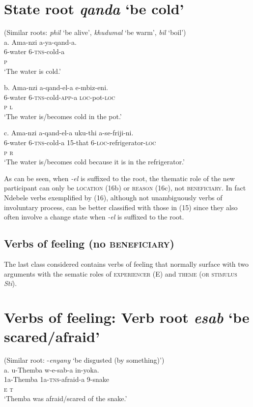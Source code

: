 \documentclass[output=paper]{langsci/langscibook}
\begin{document}
\chapter[State root  qanda ‘be cold’]{State root  \textit{qanda} ‘be cold’}
       (Similar roots: \textit{phil} ‘be alive’, \textit{khudumal} ‘be warm’, \textit{bil} ‘boil’)\\
\gll   a.  Ama-nzi   a-ya-qand-a. \\
         6-water      6-\textsc{tns}{}-cold-a\\
         \textsc{p   }\\
\glt     ‘The water is cold.’
\z

\gll   b.  Ama-nzi    a-qand-el-a       e-mbiz-eni. \\
         6-water       6-\textsc{tns}{}-cold-\textsc{app}{}-a     \textsc{loc}{}-pot-\textsc{loc}\\
         \textsc{p                  l}\\
\glt     ‘The water is/becomes cold in the pot.’
\z

\gll   c.   Ama-nzi    a-qand-el-a     uku-thi        a-se-friji-ni. \\
         6-water       6-\textsc{tns}{}-cold-a     \textsc{15}{}-that       6-\textsc{loc}{}-refrigerator-\textsc{loc}        \\
         \textsc{p                          r      }\\
\glt     ‘The water is/becomes cold because it is in the refrigerator.’
\z

As can be seen, when \textit{{}-el} is suffixed to the root, the thematic role of the new participant can only be \textsc{location }(16b) or \textsc{reason }(16c), not \textsc{beneficiary}. In fact Ndebele verbs exemplified by (16), although not unambiguously verbs of involuntary process, can be better classified with those in (15) since they also often involve a change state when \textit{{}-el} is suffixed to the root.

\section{Verbs of feeling (no \textsc{beneficiary)}}

The last class considered contains verbs of feeling that normally surface with two arguments with the sematic roles of \textsc{experiencer} (E) and \textsc{theme }(\textsc{or stimulus}\textit{ Sti}). 

\chapter[Verbs of feeling: Verb root esab ‘be scared/afraid’]{Verbs of feeling: Verb root \textit{esab} ‘be scared/afraid’}
     (Similar root: -\textit{enyany} ‘be disgusted (by something)’)\\
\gll   a.  u-Themba    w-e-sab-a         in-yoka. \\
         1a-Themba  1a-\textsc{tns}{}-afraid-a  9-snake\\
         \textsc{e                      t }\\
\glt     ‘Themba was afraid/scared of the snake.’
\z
\end{document}
